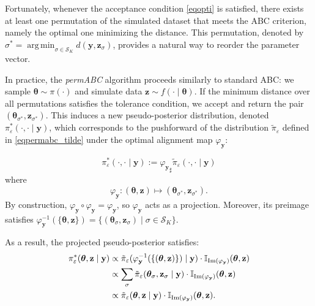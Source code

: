 \documentclass[lineno]{biometrika}
\DeclareMathOperator*{\argmin}{arg\,min}
\def\obsdata{\mathbf{y}}
\def\param{\boldsymbol{\theta}}
\def\parprop{\boldsymbol{\theta}}
\def\proj{\varphi_{\obsdata}}
\def\simdata{\mathbf{z}}
\def\projsharp{{\varphi_{\mathbf{y}}}_{\sharp}}
\begin{document}
Fortunately, whenever the acceptance condition \eqref{eqopti} is satisfied, there exists at least one permutation of the simulated dataset that meets the ABC criterion, namely the optimal one minimizing the distance. This permutation, denoted by \( \sigma^* = \argmin_{\sigma \in \mathcal{S}_K} d(\obsdata, \simdata_{\sigma}) \), provides a natural way to reorder the parameter vector.

In practice, the \emph{permABC} algorithm proceeds similarly to standard ABC: we sample \( \parprop \sim \pi(\cdot) \) and simulate data \( \simdata \sim f(\cdot \mid \parprop) \). If the minimum distance over all permutations satisfies the tolerance condition, we accept and return the pair \( (\parprop_{\sigma^*}, \simdata_{\sigma^*}) \). This induces a new pseudo-posterior distribution, denoted \( \pi_{\varepsilon}^*(\cdot, \cdot \mid \obsdata) \), which corresponds to the pushforward of the distribution \( \tilde{\pi}_\varepsilon \) defined in \eqref{eqpermabc_tilde} under the optimal alignment map \( \proj \):

\begin{equation}
\label{eqproj}
\pi^{*}_{\varepsilon}(\cdot, \cdot \mid \obsdata)
:= \projsharp \tilde{\pi}_{\varepsilon}(\cdot, \cdot \mid \obsdata)
\end{equation}
where
\[
\proj: (\param, \simdata) \mapsto (\param_{\sigma^*}, \simdata_{\sigma^*}).
\]
By construction, \( \proj \circ \proj = \proj \), so \( \proj \) acts as a projection. Moreover, its preimage satisfies \( \proj^{-1}(\{\param, \simdata\}) = \{(\param_{\sigma}, \simdata_{\sigma}) \mid \sigma \in \mathcal{S}_K\} \).

As a result, the projected pseudo-posterior satisfies:
\begin{equation*}
    \begin{split}
        \pi_{\varepsilon}^* (\param, \simdata \mid \obsdata) &  \propto \Tilde \pi_{\varepsilon} (\proj^{-1}(\{(\param, \simdata)\}) \mid \obsdata)\cdot \mathbb I_{\text{Im}(\proj)}(\param,\simdata)\\
        & \propto \sum_{\sigma} \Tilde \pi_{\varepsilon} (\param_{\sigma}, \simdata_{\sigma} \mid \obsdata)\cdot \mathbb I_{\text{Im}(\proj)}(\param,\simdata)\\
        & \propto \tilde \pi_{\varepsilon}(\param, \simdata\mid \obsdata) \cdot \mathbb I_{\text{Im}(\proj)}(\param,\simdata).
    \end{split}
\end{equation*}
\end{document}

